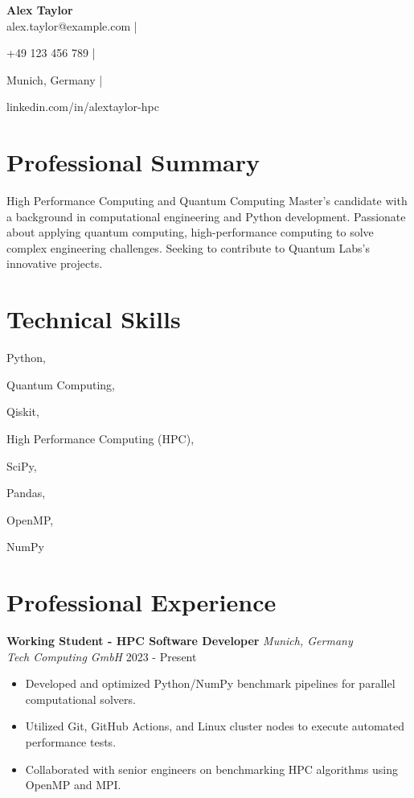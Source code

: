 \documentclass[11pt,a4paper]{article}
\newcommand{\jobtitle}[4]{
    \textbf{#1} \hfill \textit{#2}\\
    \textit{#3} \hfill #4
}
\begin{document}
\begin{center}
    {\LARGE\bfseries Alex Taylor}\\[6pt]
    
    alex.taylor@example.com | 
    
    +49 123 456 789 | 
    
    Munich, Germany | 
    
    linkedin.com/in/alextaylor-hpc
    
\end{center}

\section{Professional Summary}
High Performance Computing and Quantum Computing Master's candidate with a background in computational engineering and Python development. Passionate about applying quantum computing, high-performance computing to solve complex engineering challenges. Seeking to contribute to Quantum Labs's innovative projects.

\section{Technical Skills}

Python, 

Quantum Computing, 

Qiskit, 

High Performance Computing (HPC), 

SciPy, 

Pandas, 

OpenMP, 

NumPy


\section{Professional Experience}

\jobtitle{ Working Student - HPC Software Developer }{ Munich, Germany }{ Tech Computing GmbH }{ 2023 - Present }
\begin{itemize}[leftmargin=*,nosep,topsep=3pt]
    
    \item Developed and optimized Python/NumPy benchmark pipelines for parallel computational solvers.
    
    \item Utilized Git, GitHub Actions, and Linux cluster nodes to execute automated performance tests.
    
    \item Collaborated with senior engineers on benchmarking HPC algorithms using OpenMP and MPI.
    
\end{itemize}
\end{document}
